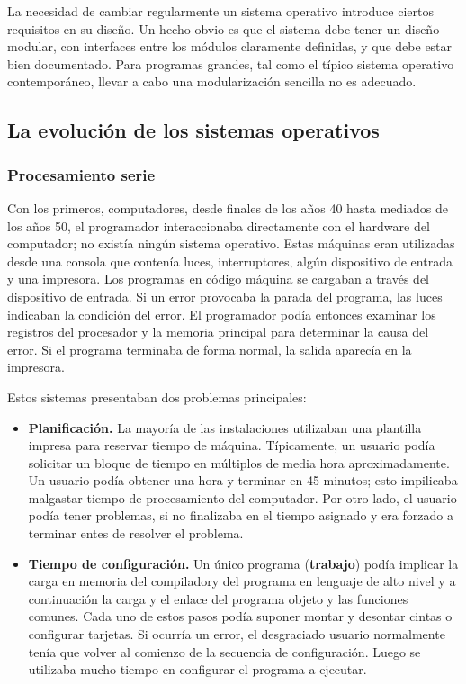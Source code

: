 \documentclass{article}
\begin{document}
					La necesidad de cambiar regularmente un sistema operativo introduce ciertos requisitos en su diseño. Un hecho obvio es que el sistema debe tener un diseño modular, con interfaces entre los módulos claramente definidas, y que debe estar bien documentado. Para programas grandes, tal como el típico sistema operativo contemporáneo, llevar a cabo una modularización sencilla no es adecuado.
					
			\subsection{La evolución de los sistemas operativos}
				\subsubsection{Procesamiento serie}
					Con los primeros, computadores, desde finales de los años 40 hasta mediados de los años 50, el programador interaccionaba directamente con el hardware del computador; no existía ningún sistema operativo. Estas máquinas eran utilizadas desde una consola que contenía luces, interruptores, algún dispositivo de entrada y una impresora. Los programas en código máquina se cargaban a través del dispositivo de entrada. Si un error provocaba la parada del programa, las luces indicaban la condición del error. El programador podía entonces examinar los registros del procesador y la memoria principal para determinar la causa del error. Si el programa terminaba de forma normal, la salida aparecía en la impresora.
				
				Estos sistemas presentaban dos problemas principales:
					\begin{itemize}
					\item \textbf{Planificación.} La mayoría de las instalaciones utilizaban una plantilla impresa para reservar tiempo de máquina. Típicamente, un usuario podía solicitar un bloque de tiempo en múltiplos de media hora aproximadamente. Un usuario podía obtener una hora y terminar en 45 minutos; esto impilicaba malgastar tiempo de procesamiento del computador. Por otro lado, el usuario podía tener problemas, si no finalizaba en el tiempo asignado y era forzado a terminar entes de resolver el problema.
					\item \textbf{Tiempo de configuración.} Un único programa (\textbf{trabajo}) podía implicar la carga en memoria del compiladory del programa en lenguaje de alto nivel y a continuación la carga y el enlace del programa objeto y las funciones comunes. Cada uno de estos pasos podía suponer montar y desontar cintas o configurar tarjetas. Si ocurría un error, el desgraciado usuario normalmente tenía que volver al comienzo de la secuencia de configuración. Luego se utilizaba mucho tiempo en configurar el programa a ejecutar.
					\end{itemize}
					
\end{document}
